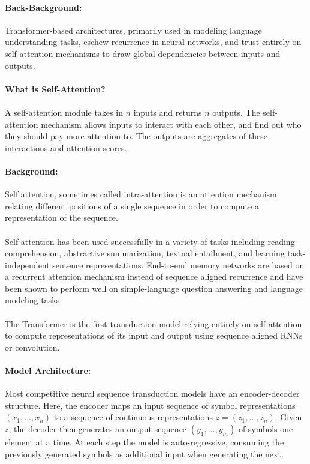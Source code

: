 \documentclass{article}
\begin{document}
\paragraph{Back-Background:}Transformer-based architectures, primarily used in modeling language
understanding tasks, eschew recurrence in neural networks, and trust entirely on self-attention mechanisms
to draw global dependencies between inputs and outputs.

\paragraph{What is Self-Attention?}
\paragraph{}A self-attention module takes in $n$ inputs and returns $n$ outputs. The self-attention
mechanism allows inputs to interact with each other, and find out who they should pay more attention to.
The outputs are aggregates of these interactions and attention scores.

\paragraph{Background:}Self attention, sometimes called intra-attention is an attention
mechanism relating different positions of a single sequence in order to compute
a representation of the sequence.

\paragraph{}Self-attention has been used successfully in a variety of tasks including reading 
comprehension, abstractive summarization, textual entailment, and learning task-independent
sentence representations. End-to-end memory networks are based on a recurrent attention mechanism
instead of sequence aligned recurrence and have been shown to perform well on simple-language 
question answering and language modeling tasks.

\paragraph{}The Transformer is the first transduction model relying entirely on self-attention to 
compute representations of its input and output using sequence aligned RNNs or convolution.

\paragraph{Model Architecture:}Most competitive neural sequence transduction models have an encoder-decoder
structure. Here, the encoder maps an input sequence of symbol representations $(x_1, \ldots, x_n)$ to a 
sequence of continuous representations $z = (z_1, \ldots, z_n)$. Given $z$, the decoder then
generates an output sequence $(y_1,\ldots, y_m)$ of symbols one element at a time. At each step
the model is auto-regressive, consuming the previously generated symbols as additional input when generating
the next.
\end{document}
